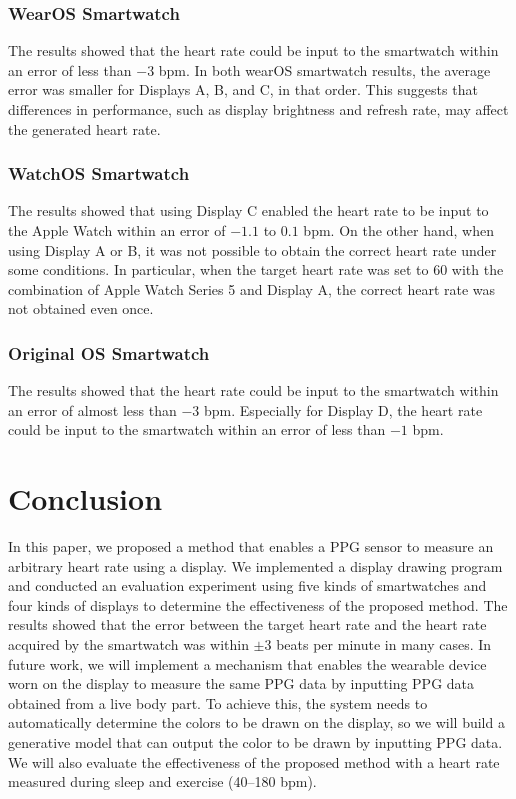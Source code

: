 \documentclass[sigconf]{acmart}
\begin{document}
\subsubsection{WearOS Smartwatch}
The results showed that the heart rate could be input to the smartwatch within an error of less than $-3$ bpm. In both wearOS smartwatch results, the average error was smaller for Displays A, B, and C, in that order. This suggests that differences in performance, such as display brightness and refresh rate, may affect the generated heart rate.


\subsubsection{WatchOS Smartwatch}
The results showed that using Display C enabled the heart rate to be input to the Apple Watch within an error of $-1.1$ to $0.1$ bpm. On the other hand, when using Display A or B, it was not possible to obtain the correct heart rate under some conditions. In particular, when the target heart rate was set to 60 with the combination of Apple Watch Series 5 and Display A, the correct heart rate was not obtained even once.


\subsubsection{Original OS Smartwatch}
The results showed that the heart rate could be input to the smartwatch within an error of almost less than $-3$ bpm. Especially for Display D, the heart rate could be input to the smartwatch within an error of less than $-1$ bpm.



\section{Conclusion}
\label{sec:conclusion}
In this paper, we proposed a method that enables a PPG sensor to measure an arbitrary heart rate using a display. We implemented a display drawing program and conducted an evaluation experiment using five kinds of smartwatches and four kinds of displays to determine the effectiveness of the proposed method. The results showed that the error between the target heart rate and the heart rate acquired by the smartwatch was within $\pm{3}$ beats per minute in many cases.
In future work, we will %
implement a mechanism that enables the wearable device worn on the display to measure the same PPG data by inputting PPG data obtained from a live body part. To achieve this, the system needs to automatically determine the colors to be drawn on the display, so we will build a generative model that can output the color to be drawn by inputting PPG data. We will also evaluate the effectiveness of the proposed method with a heart rate measured during sleep and exercise (40--180 bpm).
\end{document}
